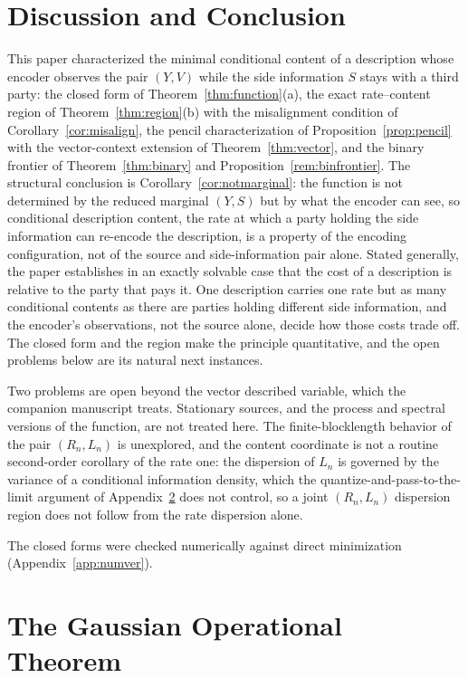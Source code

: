 \documentclass[11pt,onecolumn]{IEEEtran}
\begin{document}
\section{Discussion and Conclusion}
\label{sec:discussion}

This paper characterized the minimal conditional content of a description
whose encoder observes the pair $(Y,V)$ while the side information $S$
stays with a third party: the closed form of
Theorem~\ref{thm:function}(a), the exact rate--content region of
Theorem~\ref{thm:region}(b) with the misalignment condition of
Corollary~\ref{cor:misalign}, the pencil characterization of
Proposition~\ref{prop:pencil} with the vector-context extension of
Theorem~\ref{thm:vector}, and the binary frontier of
Theorem~\ref{thm:binary} and Proposition~\ref{rem:binfrontier}. The structural conclusion is
Corollary~\ref{cor:notmarginal}: the function is not determined by the
reduced marginal $(Y,S)$ but by what the encoder can see, so conditional
description content, the rate at which a party holding the side
information can re-encode the description, is a property of the encoding
configuration, not of the source and side-information pair alone.
Stated generally, the paper establishes in an exactly solvable case that
the cost of a description is relative to the party that pays it. One
description carries one rate but as many conditional contents as there
are parties holding different side information, and the encoder's
observations, not the source alone, decide how those costs trade off.
The closed form and the region make the principle quantitative, and the
open problems below are its natural next instances.

Two problems are open beyond the vector described variable, which the
companion manuscript \cite{bond2026vector} treats. Stationary
sources, and the process and spectral versions of the function, are not
treated here. The finite-blocklength behavior of the pair $(R_n,L_n)$ is
unexplored, and the content coordinate is not a routine second-order
corollary of the rate one: the dispersion of $L_n$ is governed by the
variance of a conditional information density, which the
quantize-and-pass-to-the-limit argument of Appendix~\ref{app:gaussian}
does not control, so a joint $(R_n,L_n)$ dispersion region does
not follow from the rate dispersion alone.

The closed forms were checked numerically against direct minimization
(Appendix~\ref{app:numver}).

\appendices
\section{The Gaussian Operational Theorem}
\label{app:gaussian}
\end{document}

